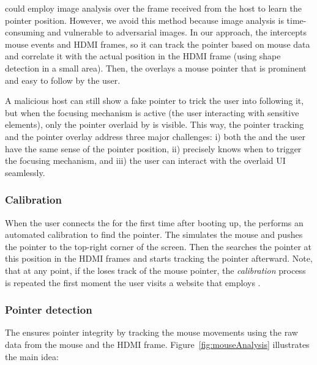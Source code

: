 \device could employ image analysis over the frame received from the host to learn the pointer position. However, we avoid this method because image analysis is time-consuming and vulnerable to adversarial images. In our approach, the \device intercepts mouse events and HDMI frames, so it can track the pointer based on mouse data and correlate it with the actual position in the HDMI frame (using shape detection in a small area). Then, the \device overlays a mouse pointer that is prominent and easy to follow by the user. 

A malicious host can still show a fake pointer to trick the user into following it, but when the focusing mechanism is active (the user interacting with sensitive elements), only the pointer overlaid by \device is visible. This way, the pointer tracking and the pointer overlay address three major challenges: i) both the \device and the user have the same sense of the pointer position, ii) \device precisely knows when to trigger the focusing mechanism, and iii) the user can interact with the overlaid UI seamlessly. 


\subsubsection{\bfseries Calibration}\label{sec:systemDesign:analysis:calibration} When the user connects the \device for the first time after booting up, the \device performs an automated calibration to find the pointer. The \device simulates the mouse and pushes the pointer to the top-right corner of the screen. Then the \device searches the pointer at this position in the HDMI frames
and starts tracking the pointer afterward. Note, that at any point, if the \device loses track of the mouse pointer, the \emph{calibration} process is repeated the first moment the user visits a website that employs \name.

\subsubsection{\bfseries Pointer detection} The \device ensures pointer integrity by tracking the mouse movements using the raw data from the mouse and the HDMI frame.  Figure~\ref{fig:mouseAnalysis} illustrates the main idea: 

